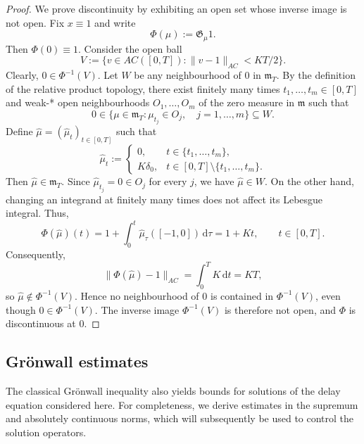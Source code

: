 \documentclass[reqno]{amsart}
\theoremstyle{plain}
\numberwithin{equation}{section}
\numberwithin{definition}{section}
\newcommand{\dd}{\ensuremath{\mathrm{d}}}
\begin{document}
\begin{proof}
We prove discontinuity by exhibiting an open set whose inverse image is not open. Fix $x\equiv 1$ and write
\begin{equation*}
    \Phi(\mu):=\mathfrak{G}_\mu 1.
\end{equation*}
Then $\Phi(0)\equiv 1$. Consider the open ball
\begin{equation*}
    V
    :=
    \big\{
        v\in AC([0,T]):
        \|v-1\|_{AC}<KT/2
    \big\}.
\end{equation*}
Clearly, $0\in\Phi^{-1}(V)$. Let $W$ be any neighbourhood of $0$ in $\mathfrak m_T$.
By the definition of the relative product topology, there
exist finitely many times $t_1,\ldots,t_m\in[0,T]$
and weak-* open neighbourhoods $O_1,\ldots,O_m$ of the
zero measure in $\mathfrak m$ such that
\begin{equation*}
    0\in
    \{
        \mu\in\mathfrak m_T:
        \mu_{t_j}\in O_j,\quad j=1,\ldots,m
    \}
    \subseteq W.
\end{equation*}
Define $ \widehat{\mu}=( \widehat{\mu}_t)_{t\in [0,T]}$ such that 
\begin{equation*}
    \widehat{\mu}_t
    :=
    \begin{cases}
        0,
        & t\in\{t_1,\ldots,t_m\},\\
        K\delta_0,
        & t\in[0,T]\setminus\{t_1,\ldots,t_m\}.
    \end{cases}
\end{equation*}
Then $\widehat{\mu}\in\mathfrak m_T$. Since $\widehat{\mu}_{t_j}=0\in O_j$
for every $j$, we have $\widehat{\mu}\in W$. On the other hand, changing an integrand at finitely many
times does not affect its Lebesgue integral. Thus,
\begin{equation*}
    \Phi(\widehat{\mu})(t)
    =
    1+\int_0^t
    \widehat{\mu}_\tau([-1,0])\,\dd\tau
    =
    1+Kt,
    \qquad t\in[0,T].
\end{equation*}
Consequently,
\begin{equation*}
    \|\Phi(\widehat{\mu})-1\|_{AC}
    =
    \int_0^T K\,\dd t
    =
    KT,
\end{equation*}
so $\widehat{\mu}\notin\Phi^{-1}(V)$. Hence no neighbourhood of $0$ is contained in
$\Phi^{-1}(V)$, even though $0\in\Phi^{-1}(V)$.
The inverse image $\Phi^{-1}(V)$ is therefore not open,
and $\Phi$ is discontinuous at $0$.
\end{proof}

\subsection{ Gr{\"o}nwall estimates}
The classical Gr{\"o}nwall  inequality also yields bounds
for solutions of the delay equation considered here.
For completeness, we derive estimates in the supremum
and absolutely continuous norms, which will subsequently
be used to control the solution operators.
\end{document}
